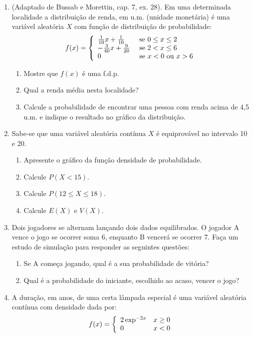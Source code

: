 \documentclass[10pt,a4paper]{book}
\providecommand{\tightlist}{%
  \setlength{\itemsep}{0pt}\setlength{\parskip}{0pt}}
\begin{document}
\begin{enumerate}
\def\labelenumi{\arabic{enumi}.}
\tightlist
\item
  (Adaptado de Bussab e Morettin, cap. 7, ex. 28). Em uma determinada
  localidade a distribuição de renda, em u.m. (unidade monetária) é uma
  variável aleatória \(X\) com função de distribuição de probabilidade:
  \[
  f(x) = \left\{ \begin{array}{ll}
      \frac{1}{10}x + \frac{1}{10} & \mbox{ se $0 \leq x \leq 2$} \cr
      -\frac{3}{40}x + \frac{9}{20} & \mbox{ se $ 2 < x \leq 6$} \cr
      0      &      \mbox{ se $x < 0$  ou  $x > 6$}
    \end{array} \right.
  \]

  \begin{enumerate}
  \def\labelenumii{\alph{enumii}.}
  \tightlist
  \item
    Mostre que \(f(x)\) é uma f.d.p.
  \item
    Qual a renda média nesta localidade?
  \item
    Calcule a probabilidade de encontrar uma pessoa com renda acima de
    4,5 u.m. e indique o resultado no gráfico da distribuição.
  \end{enumerate}
\item
  Sabe-se que uma variável aleatória contínua \(X\) é equiprovável no
  intervalo 10 e 20.

  \begin{enumerate}
  \def\labelenumii{\alph{enumii}.}
  \tightlist
  \item
    Apresente o gráfico da função densidade de probabilidade.
  \item
    Calcule \(P(X < 15)\).
  \item
    Calcule \(P(12 \leq X \leq 18)\).
  \item
    Calcule \(E(X)\) e \(V(X)\).
  \end{enumerate}
\item
  Dois jogadores se alternam lançando dois dados equilibrados. O jogador
  A vence o jogo se ocorrer soma 6, enquanto B vencerá se ocorrer 7.
  Faça um estudo de simulação para responder as seguintes questões:

  \begin{enumerate}
  \def\labelenumii{\alph{enumii}.}
  \tightlist
  \item
    Se A começa jogando, qual é a sua probabilidade de vitória?
  \item
    Qual é a probabilidade do iniciante, escolhido ao acaso, vencer o
    jogo?
  \end{enumerate}
\item
  A duração, em anos, de uma certa lâmpada especial é uma variável
  aleatória contínua com densidade dada por: \[
  f(x) = \left\{ \begin{array}{ll}
      2 \exp^{-2x} & x \geq 0 \cr
      0 & x < 0
    \end{array} \right.
  \]


\end{enumerate}
\end{document}
